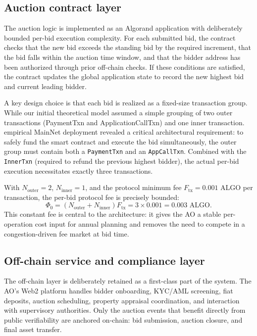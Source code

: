 \documentclass[runningheads]{llncs}
\begin{document}
\subsection{Auction contract layer}

The auction logic is implemented as an Algorand application with deliberately
bounded per-bid execution complexity. For each submitted bid, the contract
checks that the new bid exceeds the standing bid by the required increment, that
the bid falls within the auction time window, and that the bidder address has
been authorized through prior off-chain checks. If these conditions are satisfied,
the contract updates the global application state to record the new highest bid
and current leading bidder.

A key design choice is that each bid is realized as a fixed-size transaction group. While our initial theoretical model assumed a simple grouping of two outer transactions (PaymentTxn and ApplicationCallTxn) and one inner transaction. empirical MainNet deployment revealed a critical architectural requirement: to safely fund the smart contract and execute the bid simultaneously, the outer group must contain both a \texttt{PaymentTxn} and an \texttt{AppCallTxn}. Combined with the \texttt{InnerTxn} (required to refund the previous highest bidder), the actual per-bid execution necessitates exactly three transactions.

With $N_{\text{outer}} = 2$, $N_{\text{inner}} = 1$, and the protocol minimum fee $F_{\text{tx}} = 0.001$ ALGO per transaction, the per-bid protocol fee is precisely bounded:
\begin{equation}
\Phi_0 = (N_{\text{outer}} + N_{\text{inner}})F_{\text{tx}} = 3 \times 0.001 = 0.003 \text{ ALGO}.
\end{equation}
This constant fee is central to the architecture: it gives the AO a stable
per-operation cost input for annual planning and removes the need to compete in
a congestion-driven fee market at bid time.

\subsection{Off-chain service and compliance layer}

The off-chain layer is deliberately retained as a first-class part of the system.
The AO's Web2 platform handles bidder onboarding, KYC/AML screening, fiat
deposits, auction scheduling, property appraisal coordination, and interaction
with supervisory authorities. Only the auction events that benefit directly from
public verifiability are anchored on-chain: bid submission, auction closure, and
final asset transfer.
\end{document}
